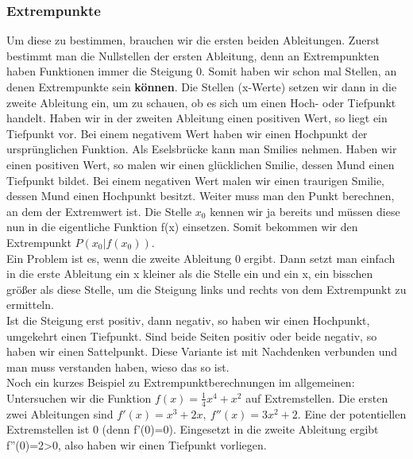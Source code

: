 	
	

	\subsubsection{Extrempunkte}
		Um diese zu bestimmen,  brauchen wir die ersten beiden Ableitungen. Zuerst
		bestimmt man die Nullstellen der ersten Ableitung, denn an Extrempunkten haben
		Funktionen immer die Steigung 0. Somit haben wir schon mal Stellen, an denen
		Extrempunkte sein \textbf{können}. Die Stellen (x-Werte) setzen wir dann in
		die zweite Ableitung ein, um zu schauen, ob es sich um einen Hoch- oder
		Tiefpunkt handelt. Haben wir in der zweiten Ableitung einen positiven Wert, so
		liegt ein Tiefpunkt vor. Bei einem negativem Wert haben wir einen Hochpunkt
		der ursprünglichen Funktion. Als Eselsbrücke kann man Smilies nehmen. Haben
		wir einen positiven Wert, so malen wir einen glücklichen Smilie, dessen Mund
		einen Tiefpunkt bildet. Bei einem negativen Wert malen wir einen traurigen
		Smilie, dessen Mund einen Hochpunkt besitzt. Weiter muss man den Punkt
		berechnen, an dem der Extremwert ist. Die Stelle \(x_0\) kennen wir ja bereits
		und müssen diese nun in die eigentliche Funktion f(x) einsetzen. Somit
		bekommen wir den Extrempunkt \(P(x_0|f(x_0))\).\\
		Ein Problem ist es, wenn die zweite Ableitung 0 ergibt. Dann setzt man einfach
		in die erste Ableitung ein x kleiner als die Stelle ein und ein x, ein
		bisschen größer als diese Stelle, um die Steigung links und rechts von dem
		Extrempunkt zu ermitteln. \\
		Ist die Steigung erst positiv, dann negativ, so haben wir einen Hochpunkt,
		umgekehrt einen Tiefpunkt. Sind beide Seiten positiv oder beide negativ, so
		haben wir einen Sattelpunkt. Diese Variante ist mit Nachdenken verbunden und
		man muss verstanden haben, wieso das so ist.\\
		Noch ein kurzes Beispiel zu Extrempunktberechnungen im allgemeinen:
		Untersuchen wir die Funktion \(f(x)=\frac{1}{4}x^4+x^2\) auf Extremstellen.
		Die ersten zwei Ableitungen sind \(f'(x)=x^3+2x,\ f''(x)=3x^2+2\). Eine der
		potentiellen Extremstellen ist 0 (denn f'(0)=0). Eingesetzt in die zweite
		Ableitung ergibt f''(0)=2>0, also haben wir einen Tiefpunkt vorliegen.
		
